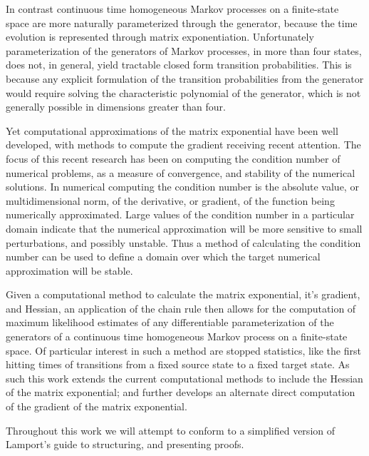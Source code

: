 In contrast continuous time homogeneous Markov processes on a finite-state space are more
naturally parameterized through the generator, because the time evolution is represented
through matrix exponentiation. Unfortunately parameterization of the generators of Markov
processes, in more than four states, does not, in general, yield tractable closed form
transition probabilities. This is because any explicit formulation of the transition
probabilities from the generator would require solving the characteristic polynomial of the
generator, which is not generally possible in dimensions greater than four. 

Yet computational approximations of the matrix exponential have been well developed, with
methods to compute the gradient receiving recent attention. The focus of this recent
research has been on computing the condition number of numerical problems, as a measure of 
convergence, and stability of the numerical solutions\cite{al-mohy_computing_2009}. In
numerical computing the condition number is the absolute value, or multidimensional norm, 
of the derivative, or gradient, of the function being numerically approximated. Large values
of the condition number in a particular domain indicate that the numerical approximation 
will be more sensitive to small perturbations, and possibly unstable. Thus a method of
calculating the condition number can be used to define a domain over which the target 
numerical approximation will be stable.

Given a computational method to calculate the matrix exponential, it's gradient, and
Hessian, an application of the chain rule then allows for the computation of maximum
likelihood estimates of any differentiable parameterization of the generators of a
continuous time homogeneous Markov process on a finite-state space. Of particular interest
in such a method are stopped statistics, like the first hitting times of transitions from a
fixed source state to a fixed target state. As such this work extends the current
computational methods to include the Hessian of the matrix exponential; and further develops
an alternate direct computation of the gradient of the matrix exponential.

Throughout this work we will attempt to conform to a simplified version of Lamport's guide
to structuring, and presenting proofs\cite{lamport_how_2012}.
